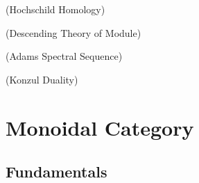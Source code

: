 \documentclass[Total.tex]{subfiles}
\begin{document}
			\begin{example}
				(Hochschild Homology)
			\end{example}
			
			\begin{example}
				(Descending Theory of Module)
			\end{example}
			
			\begin{example}
				(Adams Spectral Sequence)
			\end{example}
			
			\begin{example}
				(Konzul Duality)
			\end{example}
	\chapter{Monoidal Category}
		\section{Fundamentals}
\end{document}
